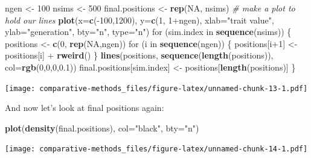 \documentclass[]{book}
\newenvironment{Shaded}{\begin{snugshade}}{\end{snugshade}}
\newcommand{\KeywordTok}[1]{\textcolor[rgb]{0.13,0.29,0.53}{\textbf{{#1}}}}
\newcommand{\DataTypeTok}[1]{\textcolor[rgb]{0.13,0.29,0.53}{{#1}}}
\newcommand{\DecValTok}[1]{\textcolor[rgb]{0.00,0.00,0.81}{{#1}}}
\newcommand{\FloatTok}[1]{\textcolor[rgb]{0.00,0.00,0.81}{{#1}}}
\newcommand{\StringTok}[1]{\textcolor[rgb]{0.31,0.60,0.02}{{#1}}}
\newcommand{\CommentTok}[1]{\textcolor[rgb]{0.56,0.35,0.01}{\textit{{#1}}}}
\newcommand{\OtherTok}[1]{\textcolor[rgb]{0.56,0.35,0.01}{{#1}}}
\newcommand{\NormalTok}[1]{{#1}}
\theoremstyle{definition}
\theoremstyle{definition}
\theoremstyle{remark}
\begin{document}
\begin{Shaded}
\begin{Highlighting}[]
\NormalTok{ngen <-}\StringTok{ }\DecValTok{100}
\NormalTok{nsims <-}\StringTok{ }\DecValTok{500}
\NormalTok{final.positions <-}\StringTok{ }\KeywordTok{rep}\NormalTok{(}\OtherTok{NA}\NormalTok{, nsims)}
\CommentTok{# make a plot to hold our lines}
\KeywordTok{plot}\NormalTok{(}\DataTypeTok{x=}\KeywordTok{c}\NormalTok{(-}\DecValTok{100}\NormalTok{,}\DecValTok{1200}\NormalTok{), }\DataTypeTok{y=}\KeywordTok{c}\NormalTok{(}\DecValTok{1}\NormalTok{, }\DecValTok{1}\NormalTok{+ngen), }\DataTypeTok{xlab=}\StringTok{"trait value"}\NormalTok{, }\DataTypeTok{ylab=}\StringTok{"generation"}\NormalTok{, }\DataTypeTok{bty=}\StringTok{"n"}\NormalTok{, }\DataTypeTok{type=}\StringTok{"n"}\NormalTok{)}
\NormalTok{for (sim.index in }\KeywordTok{sequence}\NormalTok{(nsims)) \{}
  \NormalTok{positions <-}\StringTok{ }\KeywordTok{c}\NormalTok{(}\DecValTok{0}\NormalTok{, }\KeywordTok{rep}\NormalTok{(}\OtherTok{NA}\NormalTok{,ngen))}
  \NormalTok{for (i in }\KeywordTok{sequence}\NormalTok{(ngen)) \{}
    \NormalTok{positions[i}\DecValTok{+1}\NormalTok{] <-}\StringTok{ }\NormalTok{positions[i] +}\StringTok{ }\KeywordTok{rweird}\NormalTok{()}
  \NormalTok{\}}
  \KeywordTok{lines}\NormalTok{(positions, }\KeywordTok{sequence}\NormalTok{(}\KeywordTok{length}\NormalTok{(positions)), }\DataTypeTok{col=}\KeywordTok{rgb}\NormalTok{(}\DecValTok{0}\NormalTok{,}\DecValTok{0}\NormalTok{,}\DecValTok{0}\NormalTok{,}\FloatTok{0.1}\NormalTok{))}
  \NormalTok{final.positions[sim.index] <-}\StringTok{ }\NormalTok{positions[}\KeywordTok{length}\NormalTok{(positions)]}
\NormalTok{\}}
\end{Highlighting}
\end{Shaded}

\texttt{[image: comparative-methods\_files/figure-latex/unnamed-chunk-13-1.pdf]}

And now let's look at final positions again:

\begin{Shaded}
\begin{Highlighting}[]
\KeywordTok{plot}\NormalTok{(}\KeywordTok{density}\NormalTok{(final.positions), }\DataTypeTok{col=}\StringTok{"black"}\NormalTok{, }\DataTypeTok{bty=}\StringTok{"n"}\NormalTok{)}
\end{Highlighting}
\end{Shaded}

\texttt{[image: comparative-methods\_files/figure-latex/unnamed-chunk-14-1.pdf]}
\end{document}

